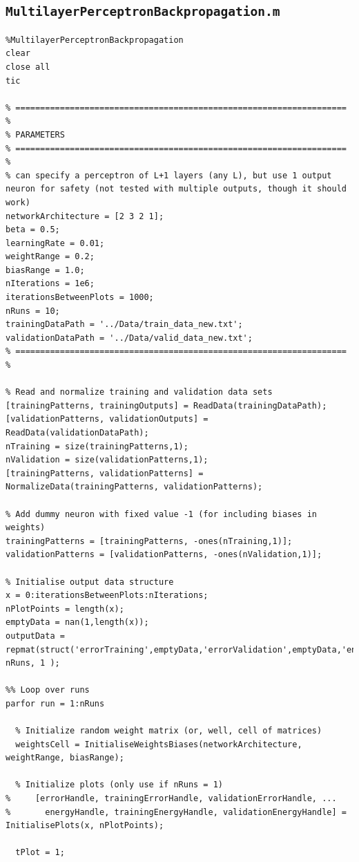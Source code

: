 \documentclass[12pt,titlepage]{article}
\begin{document}
\subsection*{\texttt{MultilayerPerceptronBackpropagation.m}}

\begin{lstlisting}
%MultilayerPerceptronBackpropagation
clear
close all
tic

% =================================================================== %
% PARAMETERS
% =================================================================== %
% can specify a perceptron of L+1 layers (any L), but use 1 output neuron for safety (not tested with multiple outputs, though it should work)
networkArchitecture = [2 3 2 1]; 
beta = 0.5;
learningRate = 0.01;
weightRange = 0.2;
biasRange = 1.0;
nIterations = 1e6;
iterationsBetweenPlots = 1000;
nRuns = 10;
trainingDataPath = '../Data/train_data_new.txt';
validationDataPath = '../Data/valid_data_new.txt';
% =================================================================== %

% Read and normalize training and validation data sets
[trainingPatterns, trainingOutputs] = ReadData(trainingDataPath);
[validationPatterns, validationOutputs] = ReadData(validationDataPath);
nTraining = size(trainingPatterns,1);
nValidation = size(validationPatterns,1);
[trainingPatterns, validationPatterns] = NormalizeData(trainingPatterns, validationPatterns);

% Add dummy neuron with fixed value -1 (for including biases in weights)
trainingPatterns = [trainingPatterns, -ones(nTraining,1)];
validationPatterns = [validationPatterns, -ones(nValidation,1)];

% Initialise output data structure
x = 0:iterationsBetweenPlots:nIterations;
nPlotPoints = length(x);
emptyData = nan(1,length(x));
outputData = repmat(struct('errorTraining',emptyData,'errorValidation',emptyData,'energyTraining',emptyData,'energyValidation',emptyData),  nRuns, 1 );

%% Loop over runs
parfor run = 1:nRuns

  % Initialize random weight matrix (or, well, cell of matrices)
  weightsCell = InitialiseWeightsBiases(networkArchitecture, weightRange, biasRange);

  % Initialize plots (only use if nRuns = 1)
%     [errorHandle, trainingErrorHandle, validationErrorHandle, ...
%       energyHandle, trainingEnergyHandle, validationEnergyHandle] = InitialisePlots(x, nPlotPoints);

  tPlot = 1;


\end{lstlisting}
\end{document}
